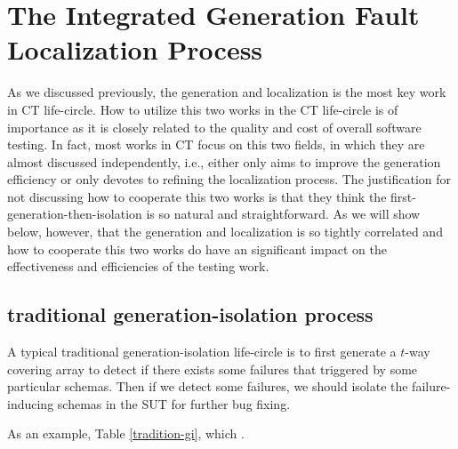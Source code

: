 \documentclass{sig-alternate}
\begin{document}
\section{The Integrated Generation Fault Localization Process}
As we discussed previously, the generation and localization is the most key work in CT life-circle. How to utilize this two works in the CT life-circle is of importance as it is closely related to the quality and cost of overall software testing. In fact, most works in CT focus on this two fields, in which they are almost discussed independently, i.e., either only aims to improve the generation efficiency or only devotes to refining the localization process. The justification for not discussing how to cooperate this two works is that they think the first-generation-then-isolation is so natural and straightforward. As we will show below, however, that the generation and localization is so tightly correlated and how to cooperate this two works do have an significant impact on the effectiveness and efficiencies of the testing work.


\subsection{traditional generation-isolation process}
A typical traditional generation-isolation life-circle is to first generate a $t$-way covering array to detect if there exists some failures that triggered by some particular schemas. Then if we detect some failures, we should isolate the failure-inducing schemas in the SUT for further bug fixing.

As an example, Table \ref{tradition-gi}, which .
\end{document}
